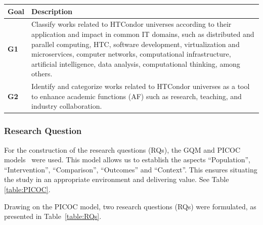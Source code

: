 \begin{table}
	{\begin{tabular}{p{1cm}p{6.8cm}} \toprule
			\textbf{Goal} & \textbf{Description}                                                                                                                                                                                                                                                                                                                                 \\
			\midrule
			\textbf{G1}   & Classify works related to HTCondor universes according to their application and impact in common IT domains, such as distributed and parallel computing, HTC, software development, virtualization and microservices, computer networks, computational infrastructure, artificial intelligence, data analysis, computational thinking, among others. \\
			\textbf{G2}   & Identify and categorize works related to HTCondor universes as a tool to enhance academic functions (AF) such as research, teaching, and industry collaboration.                                                                                                                                                                                     \\
			\bottomrule
		\end{tabular}}
	\label{table:Goals}
\end{table}


\subsubsection{Research Question}
For the construction of the research questions (RQs), the GQM and PICOC models~\cite{Needleman20026, Petticrew2008systematic} were used. This model allows us to establish the aspects ``Population'', ``Intervention'', ``Comparison'', ``Outcomes'' and ``Context''. This ensures situating the study in an appropriate environment and delivering value. See Table \ref{table:PICOC}.

Drawing on the PICOC model, two research questions (RQs) were formulated, as presented in Table~\ref{table:RQs}.

